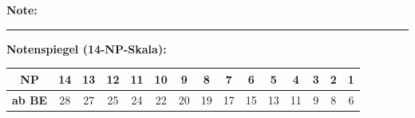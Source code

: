 \documentclass[11pt, a4paper]{article}
\newcommand{\luecke}[1]{\rule{#1}{0.4pt}}
\begin{document}
\vspace{10pt}

\begin{flushright}
\textbf{Note:} \luecke{2cm}
\end{flushright}

\vspace{1em}

\textbf{Notenspiegel (14-NP-Skala):}

\begin{center}
\footnotesize
\begin{tabular}{|c|c|c|c|c|c|c|c|c|c|c|c|c|c|c|}
\hline
\textbf{NP} & 14 & 13 & 12 & 11 & 10 & 9 & 8 & 7 & 6 & 5 & 4 & 3 & 2 & 1 \\
\hline
\textbf{ab BE} & 28 & 27 & 25 & 24 & 22 & 20 & 19 & 17 & 15 & 13 & 11 & 9 & 8 & 6 \\
\hline
\end{tabular}
\end{center}
\end{document}
